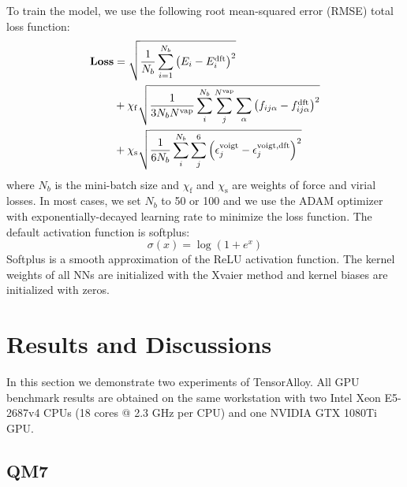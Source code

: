 \documentclass[preprint]{revtex4-2}
\begin{document}
To train the model, we use the following root mean-squared error (RMSE) total 
loss function:
\begin{align}
\label{eq:loss}
\mathbf{Loss} & = \sqrt{\frac{1}{N_{b}}\sum_{i=1}^{N_{b}}{\left(
    E_{i} - E_{i}^{\mathrm{dft}}
\right)^2}} \nonumber \\
& + \chi_{\mathrm{f}}\sqrt{
    \frac{1}{3 N_{b} N^{\mathrm{vap}}}\sum_{i}^{N_b}{\sum_{j}^{N^{\mathrm{vap}}}{
        \sum_{\alpha}{
            \left(f_{ij\alpha} - f_{ij\alpha}^{\mathrm{dft}}\right)^2
        }
    }}
} \nonumber \\
& + \chi_{\mathrm{s}}\sqrt{\frac{1}{6N_b}\sum_{i}^{N_b}{
    \sum_{j}^{6}{
        \left(
            \epsilon^{\mathrm{voigt}}_{j} - \epsilon^{\mathrm{voigt,dft}}_{j}
        \right)^2
    }
}}
\end{align}
where $N_b$ is the mini-batch size and $\chi_{\mathrm{f}}$ and 
$\chi_{\mathrm{s}}$ are weights of force and virial losses. 
In most cases, we set $N_b$ to 50 or 100 and we
use the ADAM\cite{adam} optimizer with exponentially-decayed learning rate to 
minimize the loss function. The default activation function is softplus:
\begin{equation}
\sigma(x) = \log(1 + e^x)
\end{equation}
Softplus is a smooth approximation of the ReLU activation function.
The kernel weights of all NNs are initialized with the 
Xvaier method\cite{pmlr-v9-glorot10a} and kernel biases are initialized with 
zeros.

% 
%
\section{Results and Discussions}
\label{section:discussions}

In this section we demonstrate two experiments of TensorAlloy. All GPU benchmark
results are obtained on the same workstation with two Intel Xeon E5-2687v4 CPUs
(18 cores @ 2.3 GHz per CPU) and one NVIDIA GTX 1080Ti GPU.

% 
%
\subsection{QM7}
\end{document}
